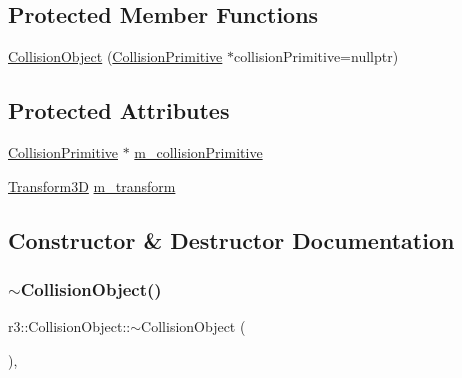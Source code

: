 \subsection*{Protected Member Functions}
\begin{DoxyCompactItemize}
\item 
\mbox{\hyperlink{classr3_1_1_collision_object_ad664d1dd3a03f183c46c6b7ba7327cfd}{Collision\+Object}} (\mbox{\hyperlink{classr3_1_1_collision_primitive}{Collision\+Primitive}} $\ast$collision\+Primitive=nullptr)
\end{DoxyCompactItemize}
\subsection*{Protected Attributes}
\begin{DoxyCompactItemize}
\item 
\mbox{\hyperlink{classr3_1_1_collision_primitive}{Collision\+Primitive}} $\ast$ \mbox{\hyperlink{classr3_1_1_collision_object_afa62ecdda20144d43f9fcf72d56642d6}{m\+\_\+collision\+Primitive}}
\item 
\mbox{\hyperlink{classr3_1_1_transform3_d}{Transform3D}} \mbox{\hyperlink{classr3_1_1_collision_object_a2ed717150a250f1b81e23ba7e5431542}{m\+\_\+transform}}
\end{DoxyCompactItemize}


\subsection{Constructor \& Destructor Documentation}
\mbox{\label{classr3_1_1_collision_object_a26f7c8a9adb08718c98dce736cc89830}} 
\subsubsection{\texorpdfstring{$\sim$\+Collision\+Object()}{~CollisionObject()}}
{\footnotesize\ttfamily r3\+::\+Collision\+Object\+::$\sim$\+Collision\+Object (\begin{DoxyParamCaption}{ }\end{DoxyParamCaption})\hspace{0.3cm}{\ttfamily [virtual]}, {\ttfamily [default]}}

\mbox{\label{classr3_1_1_collision_object_ad664d1dd3a03f183c46c6b7ba7327cfd}} 
